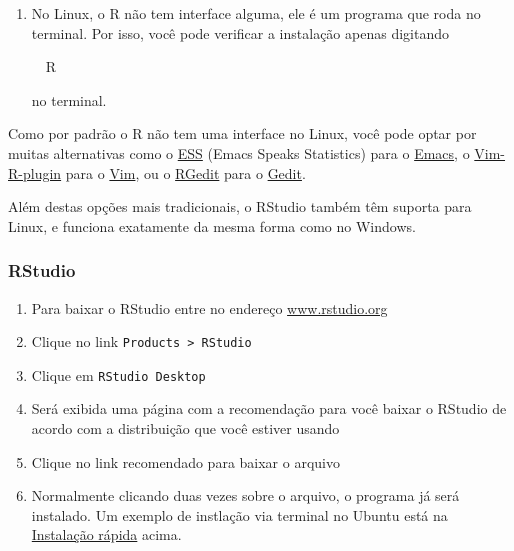 \documentclass[a4paper,12pt]{article}\usepackage[]{graphicx}\usepackage[]{color}
\makeatletter
\newcommand{\hlopt}[1]{\textcolor[rgb]{0,0,0}{#1}}%
\newcommand{\hlstd}[1]{\textcolor[rgb]{0.345,0.345,0.345}{#1}}%
\newenvironment{kframe}{%
 \def\at@end@of@kframe{}%
 \ifinner\ifhmode%
  \def\at@end@of@kframe{\end{minipage}}%
  \begin{minipage}{\columnwidth}%
 \fi\fi%
 \def\FrameCommand##1{\hskip\@totalleftmargin \hskip-\fboxsep
 \colorbox{shadecolor}{##1}\hskip-\fboxsep
     \hskip-\linewidth \hskip-\@totalleftmargin \hskip\columnwidth}%
 \MakeFramed {\advance\hsize-\width
   \@totalleftmargin\z@ \linewidth\hsize
   \@setminipage}}%
 {\par\unskip\endMakeFramed%
 \at@end@of@kframe}
\newenvironment{knitrout}{}{} %
\providecommand{\R}{\textsf{R}\xspace}
\providecommand{\RStudio}{\textsf{RStudio}\xspace}
\makeatother
\begin{document}
\begin{enumerate}
\begin{knitrout}
\begin{kframe}
\noindent
\ttfamily
\hlstd{}\hlstd{\ \ }\hlstd{.}\hlopt{/}\hlstd{configure\ }\hlopt{{-}{-}}\hlstd{enable{-}R{-}shlib}\hspace*{\fill}
\mbox{}
\normalfont
\normalsize
\end{kframe}
\end{knitrout}
  e continue com os demais comandos.
\item No Linux, o \R não tem interface alguma, ele é um programa que
  roda no terminal. Por isso, você pode verificar a instalação apenas digitando
\begin{knitrout}\small
{}\color{fgcolor}\begin{kframe}
\noindent
\ttfamily
\hlstd{}\hlstd{\ \ }\hlstd{R}\hspace*{\fill}
\mbox{}
\normalfont
\normalsize
\end{kframe}
\end{knitrout}
  no terminal.
\end{enumerate}

Como por padrão o \R não tem uma interface no Linux, você pode optar por
muitas alternativas como o \href{http://ess.r-project.org}{ESS} (Emacs
Speaks Statistics) para o
\href{http://www.gnu.org/software/emacs/}{Emacs}, o
\href{http://www.lepem.ufc.br/jaa/r-plugin.html}{Vim-R-plugin} para o
\href{http://www.vim.org}{Vim}, ou o
\href{http://rgedit.sourceforge.net}{RGedit} para o
\href{http://projects.gnome.org/gedit}{Gedit}.

Além destas opções mais tradicionais, o \RStudio também têm suporta para
Linux, e funciona exatamente da mesma forma como no Windows.

\subsubsection{\RStudio}

\begin{enumerate}
\item Para baixar o \RStudio entre no endereço
  \url{www.rstudio.org}
\item Clique no link \texttt{Products > RStudio}
\item Clique em \texttt{RStudio Desktop}
\item Será exibida uma página com a recomendação para você baixar o
  \RStudio de acordo com a distribuição que você estiver usando
\item Clique no link recomendado para baixar o arquivo
\item Normalmente clicando duas vezes sobre o arquivo, o programa já
  será instalado. Um exemplo de instlação via terminal no Ubuntu está na
  \hyperref[sec:irl]{Instalação rápida} acima.
\end{enumerate}
\end{document}
